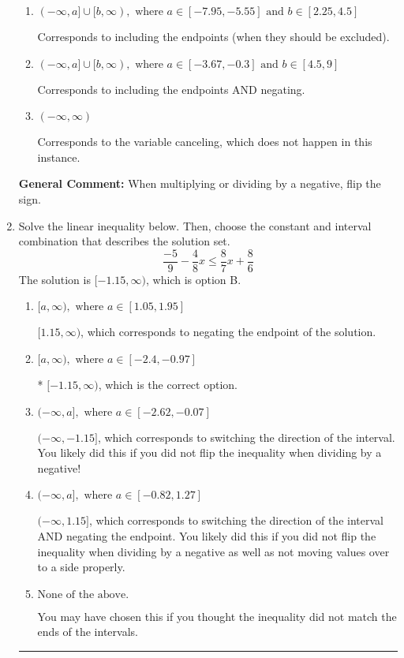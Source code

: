 \documentclass{extbook}[14pt]
\newcommand{\litem}[1]{\item #1

\rule{\textwidth}{0.4pt}}
\begin{document}
\begin{enumerate}
{\begin{enumerate}[label=\Alph*.]
 * Correct option.
\item \( (-\infty, a] \cup [b, \infty), \text{ where } a \in [-7.95, -5.55] \text{ and } b \in [2.25, 4.5] \)

Corresponds to including the endpoints (when they should be excluded).
\item \( (-\infty, a] \cup [b, \infty), \text{ where } a \in [-3.67, -0.3] \text{ and } b \in [4.5, 9] \)

Corresponds to including the endpoints AND negating.
\item \( (-\infty, \infty) \)

Corresponds to the variable canceling, which does not happen in this instance.
\end{enumerate}

\textbf{General Comment:} When multiplying or dividing by a negative, flip the sign.
}
\litem{
Solve the linear inequality below. Then, choose the constant and interval combination that describes the solution set.
\[ \frac{-5}{9} - \frac{4}{8} x \leq \frac{8}{7} x + \frac{8}{6} \]The solution is \( [-1.15, \infty) \), which is option B.\begin{enumerate}[label=\Alph*.]
\item \( [a, \infty), \text{ where } a \in [1.05, 1.95] \)

 $[1.15, \infty)$, which corresponds to negating the endpoint of the solution.
\item \( [a, \infty), \text{ where } a \in [-2.4, -0.97] \)

* $[-1.15, \infty)$, which is the correct option.
\item \( (-\infty, a], \text{ where } a \in [-2.62, -0.07] \)

 $(-\infty, -1.15]$, which corresponds to switching the direction of the interval. You likely did this if you did not flip the inequality when dividing by a negative!
\item \( (-\infty, a], \text{ where } a \in [-0.82, 1.27] \)

 $(-\infty, 1.15]$, which corresponds to switching the direction of the interval AND negating the endpoint. You likely did this if you did not flip the inequality when dividing by a negative as well as not moving values over to a side properly.
\item \( \text{None of the above}. \)

You may have chosen this if you thought the inequality did not match the ends of the intervals.
\end{enumerate}

}
\end{enumerate}
\end{document}
